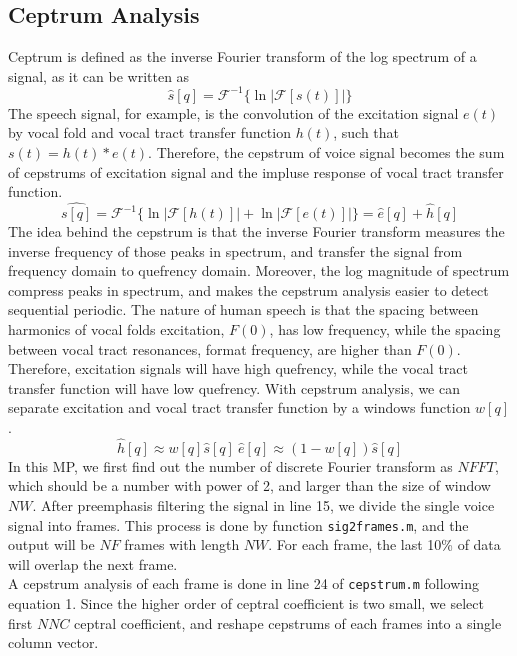 \documentclass{article}
\begin{document}
	\subsection{Ceptrum Analysis}
	Ceptrum is defined as the inverse Fourier transform of the log spectrum of a signal, as it can be written as
	$$
	\hat{s}[q]=\mathcal{F}^{-1}\{\ln |\mathcal{F}[s(t)]|\}
	$$
	The speech signal, for example, is the convolution of the excitation signal $e(t)$ by vocal fold and vocal tract transfer function $h(t)$, such that 
	$
	s(t)=h(t)*e(t)
	$.
	Therefore, the cepstrum of voice signal becomes the sum of cepstrums of excitation signal and the impluse response of vocal tract transfer function.
	$$
	\hat{s[q]}=\mathcal{F}^{-1}\{\ln |\mathcal{F}[h(t)]|+\ln |\mathcal{F}[e(t)]|\}=\hat{e}[q]+\hat{h}[q]
	$$
	The idea behind the cepstrum is that the inverse Fourier transform measures the inverse frequency of those peaks in spectrum, and transfer the signal from frequency domain to quefrency domain. Moreover, the log magnitude of spectrum compress peaks in spectrum, and makes the cepstrum analysis easier to detect sequential periodic. The nature of human speech is that the spacing between harmonics of vocal folds excitation, $F(0)$, has low frequency, while the spacing between vocal tract resonances, format frequency, are higher than $F(0)$. Therefore, excitation signals will have high quefrency, while the vocal tract transfer function will have low quefrency. With cepstrum analysis, we can separate excitation and vocal tract transfer function by a windows function $w[q]$.
	$$
	\hat{h}[q]\approx w[q]\hat{s}[q]~	\hat{e}[q]\approx(1- w[q])\hat{s}[q]
	$$
	In this MP, we first find out the number of discrete Fourier transform as $NFFT$, which should be a number with power of 2, and larger than the size of window $NW$. After preemphasis filtering the signal in line 15, we divide the single voice signal into frames. This process is done by function \texttt{sig2frames.m}, and the output will be $NF$ frames with length $NW$. For each frame, the last 10\% of data will overlap the next frame.\\
	A cepstrum analysis of each frame is done in line 24 of \texttt{cepstrum.m} following equation 1. Since the higher order of ceptral coefficient is two small, we select first $NNC$ ceptral coefficient, and reshape cepstrums of each frames into a single column vector.
	
	
	
	
\end{document}
